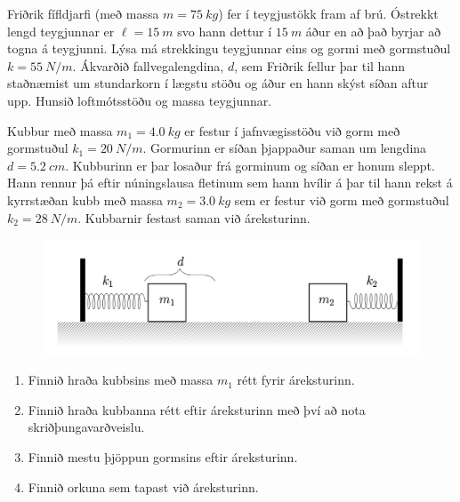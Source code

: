 \ifdefined \wholebook \else\documentclass[oneside]{book}\usepackage{EdlBook}\graphicspath{{figures/}}
\begin{document}
\begin{enumerate}[label = \textbf{Dæmi \thechapter.\arabic*.}]
\begin{minipage}{\linewidth}
    \item Friðrik fífldjarfi (með massa $m = \SI{75}{kg}$) fer í teygjustökk fram af brú. Óstrekkt lengd teygjunnar er $\ell = \SI{15}{m}$ svo hann dettur í $\SI{15}{m}$ áður en að það byrjar að togna á teygjunni. Lýsa má strekkingu teygjunnar eins og gormi með gormstuðul $k = \SI{55}{N/m}$. Ákvarðið fallvegalengdina, $d$, sem Friðrik fellur þar til hann staðnæmist um stundarkorn í lægstu stöðu og áður en hann skýst síðan aftur upp. Hunsið loftmótsstöðu og massa teygjunnar.
    
    
    \item Kubbur með massa $m_1 = \SI{4.0}{kg}$ er festur í jafnvægisstöðu við gorm með gormstuðul $k_1 = \SI{20}{N/m}$. Gormurinn er síðan þjappaður saman um lengdina $d = \SI{5.2}{cm}$. Kubburinn er þar losaður frá gorminum og síðan er honum sleppt. Hann rennur þá eftir núningslausa fletinum sem hann hvílir á þar til hann rekst á kyrrstæðan kubb með massa $m_2 = \SI{3.0}{kg}$ sem er festur við gorm með gormstuðul $k_2 = \SI{28}{N/m}$. Kubbarnir festast saman við áreksturinn.

\end{minipage}

\begin{figure}[H]
    \centering
    \includegraphics[scale = 0.35]{images/gormur.png}
\end{figure}

\begin{enumerate}[label = \textbf{(\alph*)}]
    \item Finnið hraða kubbsins með massa $m_1$ rétt fyrir áreksturinn.

    \item Finnið hraða kubbanna rétt eftir áreksturinn með því að nota skriðþungavarðveislu.
    
    \item Finnið mestu þjöppun gormsins eftir áreksturinn.
    
    \item Finnið orkuna sem tapast við áreksturinn.
\end{enumerate}


\end{enumerate}
\end{document}
